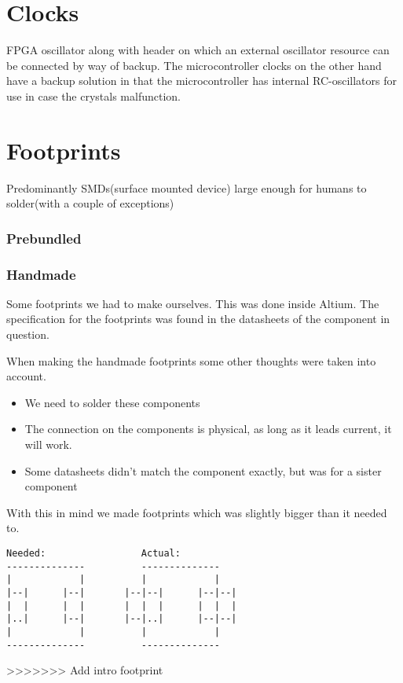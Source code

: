 \section{Clocks}
FPGA oscillator along with header on which an external oscillator resource can be connected by way of backup.
The microcontroller clocks on the other hand have a backup solution in that the microcontroller has internal RC-oscillators for use in case the crystals malfunction.


\section{Footprints}
Predominantly SMDs(surface mounted device) large enough for humans to solder(with a couple of exceptions)




\subsubsection{Prebundled}

\subsubsection{Handmade}
Some footprints we had to make ourselves.
This was done inside Altium.
The specification for the footprints was found in the datasheets of the component in question.

When making the handmade footprints some other thoughts were taken into account.

\begin{itemize}
    \item We need to solder these components
    \item The connection on the components is physical, as long as it leads current, it will work.
    \item Some datasheets didn't match the component exactly, but was for a sister component
\end{itemize}

With this in mind we made footprints which was slightly bigger than it needed to.

\begin{verbatim}
Needed:                 Actual:
--------------          --------------
|            |          |            |
|--|      |--|       |--|--|      |--|--|
|  |      |  |       |  |  |      |  |  |
|..|      |--|       |--|..|      |--|--|
|            |          |            |
--------------          --------------
\end{verbatim}
>>>>>>> Add intro footprint

